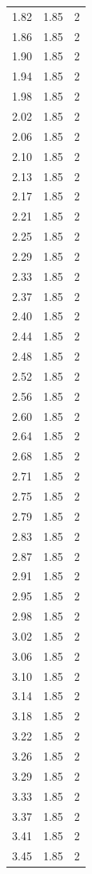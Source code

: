 \begin{longtable}{lrr}
  1.82 & 1.85 & 2 \\
  1.86 & 1.85 & 2 \\
  1.90 & 1.85 & 2 \\
  1.94 & 1.85 & 2 \\
  1.98 & 1.85 & 2 \\
  2.02 & 1.85 & 2 \\
  2.06 & 1.85 & 2 \\
  2.10 & 1.85 & 2 \\
  2.13 & 1.85 & 2 \\
  2.17 & 1.85 & 2 \\
  2.21 & 1.85 & 2 \\
  2.25 & 1.85 & 2 \\
  2.29 & 1.85 & 2 \\
  2.33 & 1.85 & 2 \\
  2.37 & 1.85 & 2 \\
  2.40 & 1.85 & 2 \\
  2.44 & 1.85 & 2 \\
  2.48 & 1.85 & 2 \\
  2.52 & 1.85 & 2 \\
  2.56 & 1.85 & 2 \\
  2.60 & 1.85 & 2 \\
  2.64 & 1.85 & 2 \\
  2.68 & 1.85 & 2 \\
  2.71 & 1.85 & 2 \\
  2.75 & 1.85 & 2 \\
  2.79 & 1.85 & 2 \\
  2.83 & 1.85 & 2 \\
  2.87 & 1.85 & 2 \\
  2.91 & 1.85 & 2 \\
  2.95 & 1.85 & 2 \\
  2.98 & 1.85 & 2 \\
  3.02 & 1.85 & 2 \\
  3.06 & 1.85 & 2 \\
  3.10 & 1.85 & 2 \\
  3.14 & 1.85 & 2 \\
  3.18 & 1.85 & 2 \\
  3.22 & 1.85 & 2 \\
  3.26 & 1.85 & 2 \\
  3.29 & 1.85 & 2 \\
  3.33 & 1.85 & 2 \\
  3.37 & 1.85 & 2 \\
  3.41 & 1.85 & 2 \\
  3.45 & 1.85 & 2 \\

\end{longtable}

